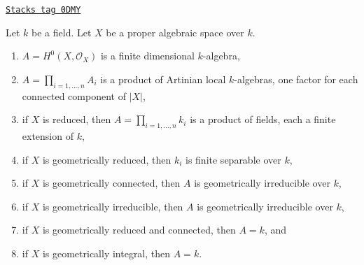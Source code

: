 \begin{lemma}
\label{spaces-over-fields-lemma-proper-geometrically-reduced-global-sections}
\href{https://stacks.math.columbia.edu/tag/0DMY}{\texttt{Stacks tag 0DMY}}

Let $k$ be a field. Let $X$ be a proper algebraic space over $k$.
\begin{enumerate}
\item $A = H^0(X, \mathcal{O}_X)$ is a finite dimensional $k$-algebra,
\item $A = \prod_{i = 1, \ldots, n} A_i$ is a product of Artinian
local $k$-algebras, one factor for each connected component of $|X|$,
\item if $X$ is reduced, then $A = \prod_{i = 1, \ldots, n} k_i$
is a product of fields, each a finite extension of $k$,
\item if $X$ is geometrically reduced, then $k_i$ is finite separable
over $k$,
\item if $X$ is geometrically connected, then $A$ is geometrically
irreducible over $k$,
\item if $X$ is geometrically irreducible, then $A$ is geometrically
irreducible over $k$,
\item if $X$ is geometrically reduced and connected, then $A = k$, and
\item if $X$ is geometrically integral, then $A = k$.
\end{enumerate}
\end{lemma}

